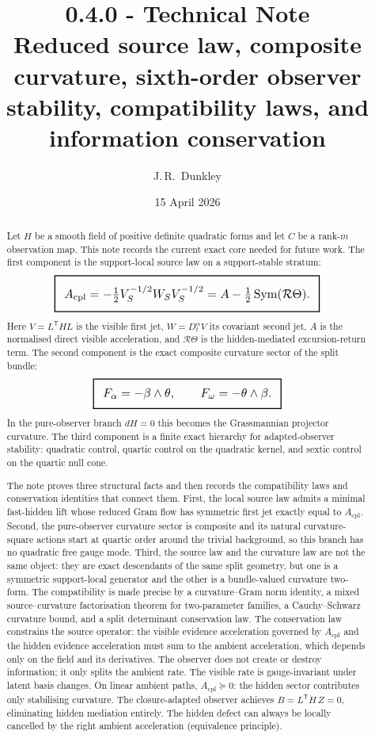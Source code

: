 \documentclass[11pt,a4paper]{article}
\title{\textbf{0.4.0 - Technical Note}\\
\large{Reduced source law, composite curvature, sixth-order observer stability, compatibility laws, and information conservation}}
\author{J.\,R.~Dunkley}
\date{15 April 2026}
\numberwithin{equation}{section}
\DeclareMathOperator{\Sym}{Sym}
\newcommand{\geomboxed}[1]{%
  \setlength{\fboxsep}{8pt}%
  \setlength{\fboxrule}{0.9pt}%
  \fbox{\scalebox{1.10}{$\displaystyle #1$}}%
}
\theoremstyle{thmcompact}
\theoremstyle{remark}
\begin{document}
\maketitle

\begin{abstract}
Let $H$ be a smooth field of positive definite quadratic forms and let $C$ be a rank-$m$ observation map. This note records the current exact core needed for future work. The first component is the support-local source law on a support-stable stratum:
\[
\geomboxed{A_{\mathrm{cpl}}=-\tfrac12V_S^{-1/2}W_SV_S^{-1/2}=A-\tfrac12\Sym(\mathcal R\Theta).}
\]
Here $V=L^{\mathsf T}\dot H L$ is the visible first jet, $W=D_t^{\alpha}V$ its covariant second jet, $A$ is the normalised direct visible acceleration, and $\mathcal R\Theta$ is the hidden-mediated excursion-return term. The second component is the exact composite curvature sector of the split bundle:
\[
\geomboxed{F_{\alpha}=-\beta\wedge\theta,
\qquad
F_{\omega}=-\theta\wedge\beta.}
\]
In the pure-observer branch $dH=0$ this becomes the Grassmannian projector curvature. The third component is a finite exact hierarchy for adapted-observer stability: quadratic control, quartic control on the quadratic kernel, and sextic control on the quartic null cone.

The note proves three structural facts and then records the compatibility laws and conservation identities that connect them. First, the local source law admits a minimal fast-hidden lift whose reduced Gram flow has symmetric first jet exactly equal to $A_{\mathrm{cpl}}$. Second, the pure-observer curvature sector is composite and its natural curvature-square actions start at quartic order around the trivial background, so this branch has no quadratic free gauge mode. Third, the source law and the curvature law are not the same object: they are exact descendants of the same split geometry, but one is a symmetric support-local generator and the other is a bundle-valued curvature two-form. The compatibility is made precise by a curvature--Gram norm identity, a mixed source--curvature factorisation theorem for two-parameter families, a Cauchy--Schwarz curvature bound, and a split determinant conservation law. The conservation law constrains the source operator: the visible evidence acceleration governed by $A_{\mathrm{cpl}}$ and the hidden evidence acceleration must sum to the ambient acceleration, which depends only on the field and its derivatives. The observer does not create or destroy information; it only splits the ambient rate. The visible rate is gauge-invariant under latent basis changes. On linear ambient paths, $A_{\mathrm{cpl}}\succeq 0$: the hidden sector contributes only stabilising curvature. The closure-adapted observer achieves $B=L^{\mathsf T}\dot H\,Z=0$, eliminating hidden mediation entirely. The hidden defect can always be locally cancelled by the right ambient acceleration (equivalence principle).
\end{abstract}
\end{document}
